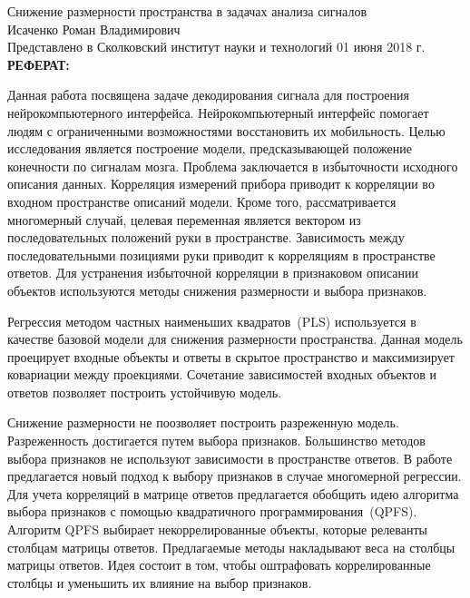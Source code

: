 \documentclass[12pt,oneside]{article}
\theoremstyle{definition}
\begin{document}
	\thispagestyle{empty}

\begin{center}
	Снижение размерности пространства в задачах анализа сигналов\\ 
	Исаченко Роман Владимирович \\[5mm]
	Представлено в Сколковский институт науки и технологий 01 июня 2018 г. \\[5mm]
	\textbf{РЕФЕРАТ:} 
\end{center}

Данная работа посвящена задаче декодирования сигнала для построения нейрокомпьютерного интерфейса.
Нейрокомпьютерный интерфейс помогает людям с ограниченными возможностями восстановить их мобильность.
Целью исследования является построение модели, предсказывающей положение конечности по сигналам мозга. 
Проблема заключается в избыточности исходного описания данных. 
Корреляция измерений прибора приводит к корреляции во входном пространстве описаний модели. 
Кроме того, рассматривается многомерный случай, целевая переменная является вектором из последовательных положений руки в пространстве. 
Зависимость между последовательными позициями руки приводит к корреляциям в пространстве ответов.
Для устранения избыточной корреляции в признаковом описании объектов используются методы снижения размерности и выбора признаков.

Регрессия методом частных наименьших квадратов~(PLS) используется в качестве базовой модели для снижения размерности пространства.
Данная модель проецирует входные объекты и ответы в скрытое пространство и максимизирует ковариации между проекциями.
Сочетание зависимостей входных объектов и ответов позволяет построить устойчивую модель.

Снижение размерности не поозволяет построить разреженную модель. Разреженность достигается путем выбора признаков.
Большинство методов выбора признаков не используют зависимости в пространстве ответов.
В работе предлагается новый подход к выбору признаков в случае многомерной регрессии.
Для учета корреляций в матрице ответов предлагается обобщить идею алгоритма выбора признаков с помощью квадратичного программирования~(QPFS). 
Алгоритм QPFS выбирает некоррелированные объекты, которые релеванты столбцам матрицы ответов. 
Предлагаемые методы накладывают веса на столбцы матрицы ответов. 
Идея состоит в том, чтобы оштрафовать коррелированные столбцы и уменьшить их влияние на выбор признаков. 
\end{document}
